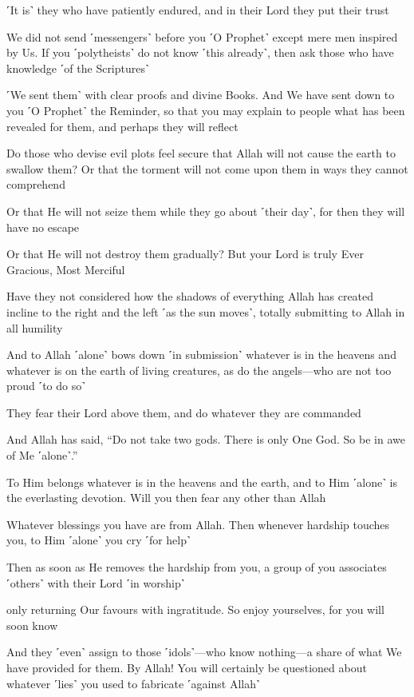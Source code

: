 ˹It is˺ they who have patiently endured, and in their Lord they put their trust

We did not send ˹messengers˺ before you ˹O Prophet˺ except mere men inspired by Us. If you ˹polytheists˺ do not know ˹this already˺, then ask those who have knowledge ˹of the Scriptures˺

˹We sent them˺ with clear proofs and divine Books. And We have sent down to you ˹O Prophet˺ the Reminder, so that you may explain to people what has been revealed for them, and perhaps they will reflect

Do those who devise evil plots feel secure that Allah will not cause the earth to swallow them? Or that the torment will not come upon them in ways they cannot comprehend

Or that He will not seize them while they go about ˹their day˺, for then they will have no escape

Or that He will not destroy them gradually? But your Lord is truly Ever Gracious, Most Merciful

Have they not considered how the shadows of everything Allah has created incline to the right and the left ˹as the sun moves˺, totally submitting to Allah in all humility

And to Allah ˹alone˺ bows down ˹in submission˺ whatever is in the heavens and whatever is on the earth of living creatures, as do the angels—who are not too proud ˹to do so˺

They fear their Lord above them, and do whatever they are commanded

And Allah has said, “Do not take two gods. There is only One God. So be in awe of Me ˹alone˺.”

To Him belongs whatever is in the heavens and the earth, and to Him ˹alone˺ is the everlasting devotion. Will you then fear any other than Allah

Whatever blessings you have are from Allah. Then whenever hardship touches you, to Him ˹alone˺ you cry ˹for help˺

Then as soon as He removes the hardship from you, a group of you associates ˹others˺ with their Lord ˹in worship˺

only returning Our favours with ingratitude. So enjoy yourselves, for you will soon know

And they ˹even˺ assign to those ˹idols˺—who know nothing—a share of what We have provided for them. By Allah! You will certainly be questioned about whatever ˹lies˺ you used to fabricate ˹against Allah˺


